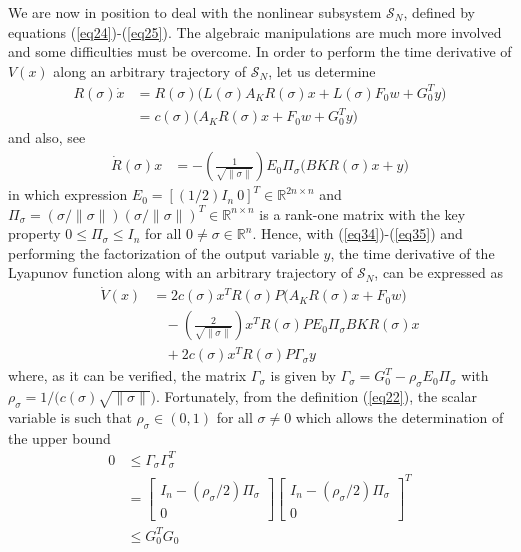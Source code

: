 \documentclass[twocolumn]{autarc_LH}
\newcommand{\Rf}{{\mathbb R}}
\begin{document}
We are now in position to deal with the nonlinear subsystem $\mathcal{S}_N$, defined by equations (\ref{eq24})-(\ref{eq25}). The algebraic manipulations are much more involved and some difficulties must be overcome. In order to perform the time derivative of $V(x)$ along an arbitrary trajectory of $\mathcal{S}_N$, let us determine
\begin{align}
	\label{eq34} R(\sigma) \dot x & = R(\sigma) \big ( L(\sigma) A_K R(\sigma) x + L(\sigma) F_0 w  +  G_0^T y \big ) \nonumber \\
	& = c(\sigma) \big ( A_K R(\sigma)x + F_0 w + G_0^T y \big )
\end{align}
and also, see \cite{gero:2023}
\begin{align} \label{eq35}
\dot R(\sigma) x  & =  - \left ( \frac{1}{\sqrt{\|\sigma\|}} \right ) E_0 \Pi_\sigma \big ( BK R(\sigma) x + y \big )
\end{align}
in which expression $E_0 = [(1/2)I_n~0]^T \in \Rf^{2n \times n}$ and $\Pi_\sigma = (\sigma /  \|\sigma\|) (\sigma /  \|\sigma\|)^T \in \Rf^{n \times n}$ is a rank-one matrix with the key property $ 0 \leq \Pi_\sigma \leq I_n$ for all $0 \neq \sigma \in \Rf^n$. Hence, with (\ref{eq34})-(\ref{eq35}) and performing the factorization of the output variable $y$, the time derivative of the Lyapunov function along with an arbitrary trajectory of $\mathcal{S}_N$, can be expressed as 
\begin{align}
\label{eq36} \dot  V(x) & = 2 c(\sigma) x^T R(\sigma)P \big ( A_K R(\sigma)x + F_0 w \big )  \nonumber \\
& ~~~~ - \left ( \frac{2}{\sqrt{\|\sigma\|}} \right ) x^TR(\sigma)P E_0 \Pi_\sigma  BK R(\sigma) x \nonumber \\
& ~~~~ + 2 c(\sigma)  x^TR(\sigma) P \Gamma_\sigma y
\end{align}
where, as it can be verified, the matrix $\Gamma_\sigma$ is given by $\Gamma_\sigma = G_0^T - \rho_\sigma E_0 \Pi_\sigma$ with $\rho_\sigma  = 1 / \big ( c(\sigma)\sqrt{\|\sigma\|} \big )$. Fortunately, from the definition (\ref{eq22}), the scalar variable is such that $\rho_\sigma \in (0, 1)$ for all $\sigma \neq 0$ which allows the determination of the upper bound  
\begin{align}
\label{eq37} 0 & \leq  \Gamma_\sigma \Gamma_\sigma^T   \nonumber \\
& = \left [ \begin{array}{c} I_n - (\rho_\sigma/2) \Pi_\sigma \\ 0 \end{array} \right ] \left [ \begin{array}{c} I_n - (\rho_\sigma/2) \Pi_\sigma \\ 0 \end{array} \right ]^T \nonumber \\
& \leq G_0^T G_0
\end{align}
\end{document}

